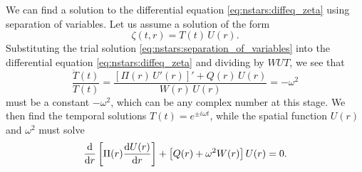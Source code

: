 We can find a solution to the differential equation \eqref{eq:nstars:diffeq_zeta} using separation of variables.
Let us assume a solution of the form
\begin{equation}
	\zeta(t,r) = T(t) \, U(r) .
\label{eq:nstars:separation_of_variables}
\end{equation}
Substituting the trial solution \eqref{eq:nstars:separation_of_variables} into the differential equation \eqref{eq:nstars:diffeq_zeta} and dividing by $W U T$, we see that
\begin{equation}
	\frac{\ddot{T}(t)}{T(t)} = \frac{\left[ \Pi(r) \, U'(r) \right]' + Q(r) \, U(r)}{W(r) \, U(r)} = -\omega^2
\end{equation}
must be a constant $-\omega^2$, which can be any complex number at this stage.
We then find the temporal solutions $T(t) = e^{\pm i \omega t}$, while the spatial function $U(r)$ and $\omega^2$ must solve
\begin{equation}
	\odv*{ \left[ \Pi(r) \odv{U(r)}{r} \right] }{r} + \left[ Q(r) + \omega^2 W(r) \right] U(r) = 0 .
\label{eq:nstars:diffeq_U}
\end{equation}


